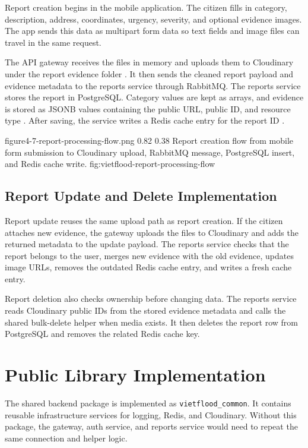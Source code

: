 Report creation begins in the mobile application. The citizen fills in category, description, address, coordinates, urgency, severity, and optional evidence images. The app sends this data as multipart form data so text fields and image files can travel in the same request.

The API gateway receives the files in memory and uploads them to Cloudinary under the report evidence folder \cite{cloudinaryUploadDocs}. It then sends the cleaned report payload and evidence metadata to the reports service through RabbitMQ. The reports service stores the report in PostgreSQL. Category values are kept as arrays, and evidence is stored as JSONB values containing the public URL, public ID, and resource type \cite{postgresqlJsonDocs}. After saving, the service writes a Redis cache entry for the report ID \cite{redisDocs}.

\vfplaceholderfigure
    {figure4-7-report-processing-flow.png}
    {0.82}
    {0.38}
    {Report creation flow from mobile form submission to Cloudinary upload, RabbitMQ message, PostgreSQL insert, and Redis cache write.}
    {fig:vietflood-report-processing-flow}

\subsection{Report Update and Delete Implementation}

Report update reuses the same upload path as report creation. If the citizen attaches new evidence, the gateway uploads the files to Cloudinary and adds the returned metadata to the update payload. The reports service checks that the report belongs to the user, merges new evidence with the old evidence, updates image URLs, removes the outdated Redis cache entry, and writes a fresh cache entry.

Report deletion also checks ownership before changing data. The reports service reads Cloudinary public IDs from the stored evidence metadata and calls the shared bulk-delete helper when media exists. It then deletes the report row from PostgreSQL and removes the related Redis cache key.

\section{Public Library Implementation}

The shared backend package is implemented as \texttt{vietflood\_common}. It contains reusable infrastructure services for logging, Redis, and Cloudinary. Without this package, the gateway, auth service, and reports service would need to repeat the same connection and helper logic.

